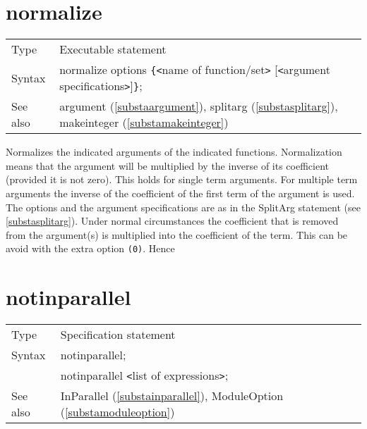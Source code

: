 
\section{normalize}
\label{substanormalize}

\noindent \begin{tabular}{ll}
Type & Executable statement\\
Syntax & normalize options \verb:{:{\tt<}name of function/set{\tt>}
         [{\tt<}argument specifications{\tt>}]\verb:}:;
\\ See also & argument (\ref{substaargument}), splitarg 
            (\ref{substasplitarg}), makeinteger (\ref{substamakeinteger})
\end{tabular} \vspace{4mm}

\noindent Normalizes the indicated 
arguments of the indicated functions. Normalization means 
that the argument will be multiplied by the inverse of its 
coefficient 
(provided it is not zero). This holds for single term arguments. For 
multiple term arguments the inverse of the coefficient of the first term of 
the argument is used. The options and the argument specifications are as in 
the SplitArg statement (see \ref{substasplitarg}). Under normal 
circumstances the coefficient that is removed from the argument(s) is 
multiplied into the coefficient of the term. This can be avoid with the 
extra option
\verb:(0):. Hence


\vspace{10mm}


\section{notinparallel}
\label{substanotinparallel}

\noindent \begin{tabular}{ll}
Type & Specification statement\\
Syntax & notinparallel; \\
       & notinparallel {\tt<}list of expressions{\tt>};
\\ See also & InParallel (\ref{substainparallel}), 
     ModuleOption (\ref{substamoduleoption})
\end{tabular} \vspace{4mm}


